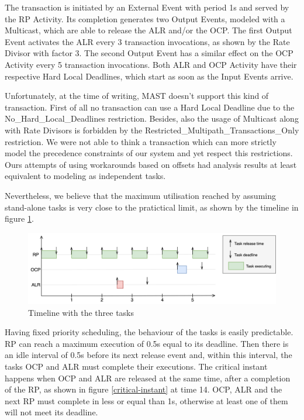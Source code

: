\documentclass{article}
\begin{document}
The transaction is initiated by an External Event with period 1s and served by the RP Activity. Its completion generates two Output Events, modeled with a Multicast, which are able to release the ALR and/or the OCP. The first Output Event activates the ALR every 3 transaction invocations, as shown by the Rate Divisor with factor 3. The second Output Event has a similar effect on the OCP Activity every 5 transaction invocations. Both ALR and OCP Activity have their respective Hard Local Deadlines, which start as soon as the Input Events arrive.

Unfortunately, at the time of writing, MAST doesn't support this kind of transaction. First of all no transaction can use a Hard Local Deadline due to the No\_Hard\_Local\_Deadlines restriction. Besides, also the usage of Multicast along with Rate Divisors is forbidden by the Restricted\_Multipath\_Transactions\_Only restriction. We were not able to think a transaction which can more strictly model the precedence constraints of our system and yet respect this restrictions. Ours attempts of using workarounds based on offsets had analysis results at least equivalent to modeling as independent tasks.

Nevertheless, we believe that the maximum utilisation reached by assuming stand-alone tasks is very close to the pratictical limit, as shown by the timeline in figure \ref{timeline}.

\newpage

\begin{figure}[!htbp]
\centering
\includegraphics[width=5in]{images/timeline}
\caption{Timeline with the three tasks}
\label{timeline}
\end{figure}

Having fixed priority scheduling, the behaviour of the tasks is easily predictable. RP can reach a maximum execution of 0.5s equal to its deadline. Then there is an idle interval of 0.5s before its next release event and, within this interval, the tasks OCP and ALR must complete their executions. The critical instant happens when OCP and ALR are released at the same time, after a completion of the RP, as shown in figure \ref{critical-instant} at time 14. OCP, ALR and the next RP must complete in less or equal than 1s, otherwise at least one of them will not meet its deadline.
\end{document}
